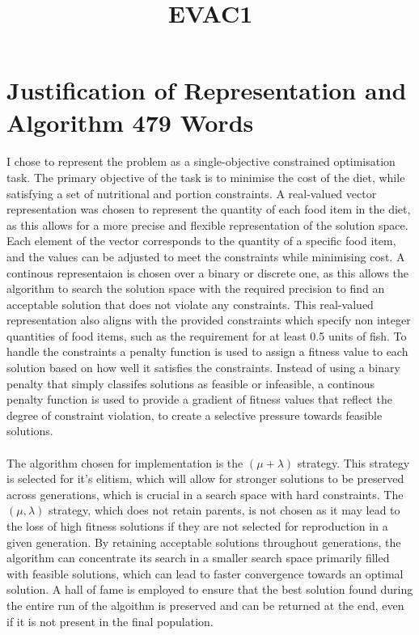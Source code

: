 \documentclass[11pt]{article}
\title{EVAC1}
\date{}
\author{}
\begin{document}
\maketitle

\section{Justification of Representation and Algorithm 479 Words} 
\paragraph{}
I chose to represent the problem as a single-objective constrained optimisation task. The primary objective of the task is to minimise the cost of the diet, while satisfying a set of nutritional and portion constraints.
A real-valued vector representation was chosen to represent the quantity of each food item in the diet, as this allows for a more precise and flexible representation of the solution space. 
Each element of the vector corresponds to the quantity of a specific food item, and the values can be adjusted to meet the constraints while minimising cost. A continous representaion is chosen over a binary or discrete one, as this allows the algorithm to search the solution space with the required precision to find an acceptable solution that does not violate any constraints. This real-valued representation also aligns with the provided constraints which specify non integer quantities of food items, such as the requirement for at least 0.5 units of fish. To handle the constraints a penalty function is used to assign a fitness value to each solution based on how well it satisfies the constraints. Instead of using a binary penalty that simply classifes solutions as feasible or infeasible, a continous penalty function is used to provide a gradient of fitness values that reflect the degree of constraint violation, to create a selective pressure towards feasible solutions. 

\paragraph{}
The algorithm chosen for implementation is the $(\mu+\lambda)$ strategy. This strategy is selected for it's elitism, which will allow for stronger solutions to be preserved across generations, which is crucial in a search space with hard constraints. The $(\mu,\lambda)$ strategy, which does not retain parents, is not chosen as it may lead to the loss of high fitness solutions if they are not selected for reproduction in a given generation. By retaining acceptable solutions throughout generations, the algorithm can concentrate its search in a smaller search space primarily filled with feasible solutions, which can lead to faster convergence towards an optimal solution. A hall of fame is employed to ensure that the best solution found during the entire run of the algoithm is preserved and can be returned at the end, even if it is not present in the final population.
\end{document}
